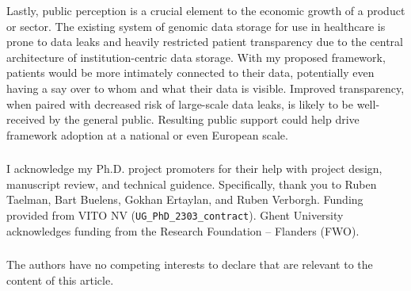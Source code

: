 \documentclass[runningheads]{llncs}
\begin{document}
Lastly, public perception is a crucial element to the economic growth of a product or sector. 
The existing system of genomic data storage for use in healthcare is prone to data leaks and heavily restricted patient transparency due to the central architecture of institution-centric data storage. 
With my proposed framework, patients would be more intimately connected to their data, potentially even having a say over to whom and what their data is visible. 
Improved transparency, when paired with decreased risk of large-scale data leaks, is likely to be well-received by the general public. 
Resulting public support could help drive framework adoption at a national or even European scale. 


\begin{credits}
\subsubsection{\ackname} 
I acknowledge my Ph.D. project promoters for their help with project design, manuscript review, and technical guidence.
Specifically, thank you to Ruben Taelman, Bart Buelens, Gokhan Ertaylan, and Ruben Verborgh.
Funding provided from VITO NV (\verb|UG_PhD_2303_contract|). 
Ghent University acknowledges funding from the Research Foundation – Flanders (FWO).
\subsubsection{\discintname} The authors have no competing interests to declare that are relevant to the content of this article.
\end{credits}



\end{document}
